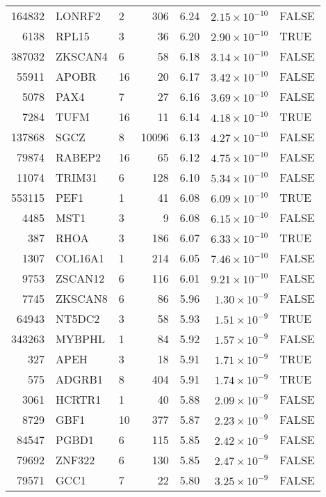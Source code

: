 \begin{table}[ht]
\begin{adjustbox}{totalheight=10in}
\begin{tabular}{rllrrrl}
  164832 & LONRF2 & 2 & 306 & 6.24 & $2.15 \times 10^{-10}$ & FALSE \\ 
  6138 & RPL15 & 3 &  36 & 6.20 & $2.90 \times 10^{-10}$ & TRUE \\ 
  387032 & ZKSCAN4 & 6 &  58 & 6.18 & $3.14 \times 10^{-10}$ & FALSE \\ 
  55911 & APOBR & 16 &  20 & 6.17 & $3.42 \times 10^{-10}$ & FALSE \\ 
  5078 & PAX4 & 7 &  27 & 6.16 & $3.69 \times 10^{-10}$ & FALSE \\ 
  7284 & TUFM & 16 &  11 & 6.14 & $4.18 \times 10^{-10}$ & TRUE \\ 
  137868 & SGCZ & 8 & 10096 & 6.13 & $4.27 \times 10^{-10}$ & FALSE \\ 
  79874 & RABEP2 & 16 &  65 & 6.12 & $4.75 \times 10^{-10}$ & FALSE \\ 
  11074 & TRIM31 & 6 & 128 & 6.10 & $5.34 \times 10^{-10}$ & FALSE \\ 
  553115 & PEF1 & 1 &  41 & 6.08 & $6.09 \times 10^{-10}$ & TRUE \\ 
  4485 & MST1 & 3 &   9 & 6.08 & $6.15 \times 10^{-10}$ & FALSE \\ 
  387 & RHOA & 3 & 186 & 6.07 & $6.33 \times 10^{-10}$ & TRUE \\ 
  1307 & COL16A1 & 1 & 214 & 6.05 & $7.46 \times 10^{-10}$ & FALSE \\ 
  9753 & ZSCAN12 & 6 & 116 & 6.01 & $9.21 \times 10^{-10}$ & FALSE \\ 
  7745 & ZKSCAN8 & 6 &  86 & 5.96 & $1.30 \times 10^{-9}$ & FALSE \\ 
  64943 & NT5DC2 & 3 &  58 & 5.93 & $1.51 \times 10^{-9}$ & TRUE \\ 
  343263 & MYBPHL & 1 &  84 & 5.92 & $1.57 \times 10^{-9}$ & FALSE \\ 
  327 & APEH & 3 &  18 & 5.91 & $1.71 \times 10^{-9}$ & TRUE \\ 
  575 & ADGRB1 & 8 & 404 & 5.91 & $1.74 \times 10^{-9}$ & TRUE \\ 
  3061 & HCRTR1 & 1 &  40 & 5.88 & $2.09 \times 10^{-9}$ & FALSE \\ 
  8729 & GBF1 & 10 & 377 & 5.87 & $2.23 \times 10^{-9}$ & FALSE \\ 
  84547 & PGBD1 & 6 & 115 & 5.85 & $2.42 \times 10^{-9}$ & FALSE \\ 
  79692 & ZNF322 & 6 & 130 & 5.85 & $2.47 \times 10^{-9}$ & FALSE \\ 
  79571 & GCC1 & 7 &  22 & 5.80 & $3.25 \times 10^{-9}$ & FALSE \\ 

\end{tabular}
\end{adjustbox}
\end{table}
